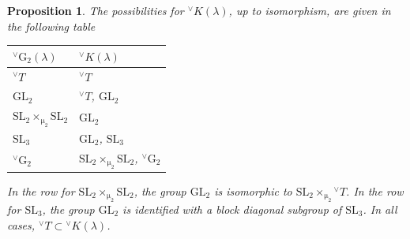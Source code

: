 \documentclass[a4paper, 11pt]{article}
\newtheorem{prop}[theo]{Proposition}
\begin{document}
\begin{prop}
\label{Ilambdaorbits}
The possibilities for ${^\vee}K(\lambda)$, up to
isomorphism, are given in the following
table
\begin{center}
\begin{tabular}{|l|l|}
\hline
${^\vee}\mathrm{G}_{2}(\lambda)$ & ${^\vee}K(\lambda)$ \\
\hline \hline
${^\vee}T$ & ${^\vee}T$  \\ 
\hline 
$\mathrm{GL}_{2}$ & ${^\vee}T$, $\mathrm{GL}_{2}$ \\
\hline
$\mathrm{SL}_{2} \times_{\upmu_{2}} \mathrm{SL}_{2}$ & $\mathrm{GL}_{2}$ \\
\hline
$\mathrm{SL}_{3}$ & $\mathrm{GL}_{2}$, $\mathrm{SL}_{3}$ \\
\hline
${^\vee}\mathrm{G}_{2}$ & $\mathrm{SL}_{2} \times_{\upmu_{2}} \mathrm{SL}_{2}$,
${^\vee}\mathrm{G}_{2}$ \\
\hline
\end{tabular}
\end{center}
In the row for $\mathrm{SL}_{2} \times_{\upmu_{2}} \mathrm{SL}_{2}$,
the group $\mathrm{GL}_{2}$ is isomorphic to
$\mathrm{SL}_{2} \times_{\upmu_{2}} {^\vee}T$. In the row for $\mathrm{SL}_{3}$,
the group $\mathrm{GL}_{2}$ is identified with a block diagonal
subgroup of $\mathrm{SL}_{3}$.  In all cases, ${^\vee}T \subset
{^\vee}K(\lambda)$. 
\end{prop}
\end{document}
